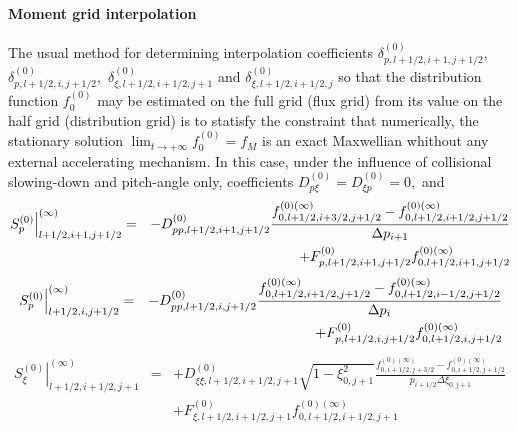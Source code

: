 
\paragraph{Moment grid interpolation}

The usual method for determining interpolation coefficients $\delta
_{p,l+1/2,i+1,j+1/2}^{\left( 0\right) },$ $\delta _{p,l+1/2,i,j+1/2}^{\left(
0\right) },$ $\delta _{\xi ,l+1/2,i+1/2,j+1}^{\left( 0\right) }$ and $\delta
_{\xi ,l+1/2,i+1/2,j}^{\left( 0\right) }$ so that the distribution function $%
f_{0}^{\left( 0\right) }$ may be estimated on the full grid (flux grid) from
its value on the half grid (distribution grid) is to statisfy the constraint
that numerically, the stationary solution $\lim_{t\rightarrow +\infty
}f_{0}^{\left( 0\right) }=f_{M}$ is an exact Maxwellian whithout any
external accelerating mechanism. In this case, under the influence of
collisional slowing-down and pitch-angle only, coefficients $D_{p\xi
}^{\left( 0\right) }=D_{\xi p}^{\left( 0\right) }=0,$ and
\begin{eqnarray}
\left. S_{p}^{\left( 0\right) }\right| _{l+1/2,i+1,j+1/2}^{(\infty )}
&=&-D_{pp,l+1/2,i+1,j+1/2}^{\left( 0\right) }\frac{f_{0,l+1/2,i+3/2,j+1/2}^{%
\left( 0\right) (\infty )}-f_{0,l+1/2,i+1/2,j+1/2}^{\left( 0\right) (\infty
)}}{\Delta p_{i+1}}  \nonumber \\
&&+F_{p,l+1/2,i+1,j+1/2}^{\left( 0\right) }f_{0,l+1/2,i+1,j+1/2}^{\left(
0\right) (\infty )}
\end{eqnarray}
\begin{eqnarray}
\left. S_{p}^{\left( 0\right) }\right| _{l+1/2,i,j+1/2}^{(\infty )}
&=&-D_{pp,l+1/2,i,j+1/2}^{\left( 0\right) }\frac{f_{0,l+1/2,i+1/2,j+1/2}^{%
\left( 0\right) (\infty )}-f_{0,l+1/2,i-1/2,j+1/2}^{\left( 0\right) (\infty
)}}{\Delta p_{i}}  \nonumber \\
&&+F_{p,l+1/2,i,j+1/2}^{\left( 0\right) }f_{0,l+1/2,i,j+1/2}^{\left(
0\right) (\infty )}
\end{eqnarray}
\begin{eqnarray}
\left. S_{\xi }^{\left( 0\right) }\right| _{l+1/2,i+1/2,j+1}^{(\infty )}
&=&+D_{\xi \xi ,l+1/2,i+1/2,j+1}^{\left( 0\right) }\sqrt{1-\xi _{0,j+1}^{2}}%
\frac{f_{0,i+1/2,j+3/2}^{\left( 0\right) (\infty
)}-f_{0,i+1/2,j+1/2}^{\left( 0\right) (\infty )}}{p_{i+1/2}\Delta \xi
_{0,j+1}}  \nonumber \\
&&+F_{\xi ,l+1/2,i+1/2,j+1}^{\left( 0\right) }f_{0,l+1/2,i+1/2,j+1}^{\left(
0\right) (\infty )}
\end{eqnarray}
